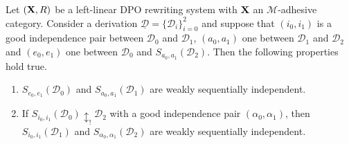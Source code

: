 \documentclass[a4paper,UKenglish,cleveref,pdftex, thm-restate,numberwithinsect]{lipics}
\def\R{\mathsf{R}}
\def\X{\textbf {\textup{X}}}
\newcommand{\dder}[1]{\mathscr{#1}}
\newcommand{\der}[1]{\underline{\dder{#1}}}
\begin{document}
\begin{lemma}\label{lem:iig1}Let $(\X,\R)$ be a left-linear DPO rewriting system with $\X$ an $\mathcal{M}$-adhesive category. Consider a derivation $\der{D}=\{\dder{D}_i\}_{i=0}^2$ and suppose that $(i_0,i_1)$ is a good independence pair between $\dder{D}_0$ and $\dder{D}_1$, $(a_0,a_1)$ one between $\dder{D}_1$ and $\dder{D}_2$ and $(e_0, e_1)$ one between $\dder{D}_0$ and $S_{a_0,a_1}(\dder{D}_2)$. Then the following properties hold true.
	\begin{enumerate}
		\item $S_{e_0,e_1}(\dder{D}_0)$ and $S_{a_0,a_1}(\dder{D}_1)$ are weakly sequentially independent.
		\item If $S_{i_0, i_1}(\dder{D}_0)\updownarrow_! \dder{D}_2$ with a good independence pair $(\alpha_0, \alpha_1)$, then  $S_{i_0,i_1}(\dder{D}_1)$ and $S_{\alpha_0, \alpha_1}(\dder{D}_2)$ are weakly sequentially independent.
	\end{enumerate}
	
\end{lemma}
\end{document}
